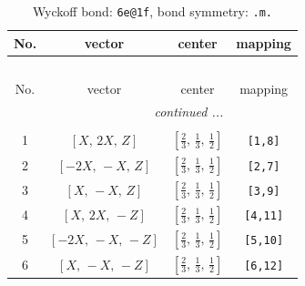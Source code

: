 \documentclass[fleqn,8pt]{jsarticle}
\begin{document}
\renewcommand{\arraystretch}{1.2}
\begin{longtable}{cccc}
\caption{Wyckoff bond: {\tt 6e@1f}, bond symmetry: {\tt .m.}}
 \\
 \hline \hline
No. & vector & center & mapping \\ \hline \endfirsthead

\multicolumn{3}{l}{\tablename\ \thetable{}} \\
 \hline \hline
No. & vector & center & mapping \\ \hline \endhead

 \hline \hline
\multicolumn{3}{r}{\footnotesize\it continued ...} \\ \endfoot

 \hline \hline
\multicolumn{3}{r}{} \\ \endlastfoot

1 & $\left[ X,\, 2 X,\, Z \right]$ & $\left[ \frac{2}{3},\, \frac{1}{3},\, \frac{1}{2} \right]$ & {\tt [1,8]} \\ \hline
2 & $\left[ - 2 X,\, - X,\, Z \right]$ & $\left[ \frac{2}{3},\, \frac{1}{3},\, \frac{1}{2} \right]$ & {\tt [2,7]} \\ \hline
3 & $\left[ X,\, - X,\, Z \right]$ & $\left[ \frac{2}{3},\, \frac{1}{3},\, \frac{1}{2} \right]$ & {\tt [3,9]} \\ \hline
4 & $\left[ X,\, 2 X,\, - Z \right]$ & $\left[ \frac{2}{3},\, \frac{1}{3},\, \frac{1}{2} \right]$ & {\tt [4,11]} \\ \hline
5 & $\left[ - 2 X,\, - X,\, - Z \right]$ & $\left[ \frac{2}{3},\, \frac{1}{3},\, \frac{1}{2} \right]$ & {\tt [5,10]} \\ \hline
6 & $\left[ X,\, - X,\, - Z \right]$ & $\left[ \frac{2}{3},\, \frac{1}{3},\, \frac{1}{2} \right]$ & {\tt [6,12]} \\
\end{longtable}
\renewcommand{\arraystretch}{1.2}
\end{document}

